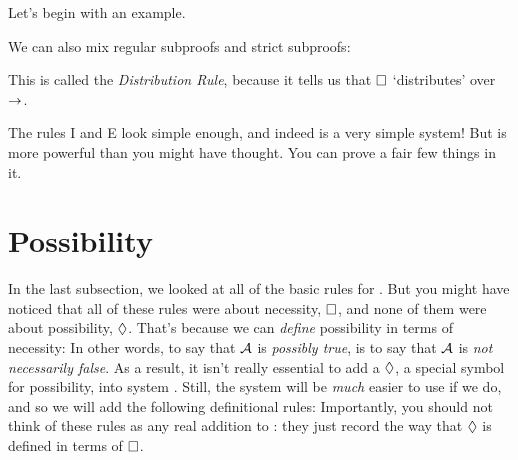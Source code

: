 Let's begin with an example.
\begin{fitchproof}
		\PR
		\PR
		\open
		\AS
		\close
\end{fitchproof}
We can also mix regular subproofs and strict subproofs:
\begin{fitchproof}
		\PR
		\open
		\AS
		\open
		\AS
		\close
		\close
		 
\end{fitchproof}
This is called the \emph{Distribution Rule}, because it tells us that $\Box$ `distributes' over $\rightarrow$.

The rules \ebox I and \ebox E look simple enough, and indeed \mlK{} is a very simple system! But \mlK{} is more powerful than you might have thought. You can prove a fair few things in it.

\section{Possibility}
\label{possibility}

In the last subsection, we looked at all of the basic rules for \mlK. But you might have noticed that all of these rules were about necessity, $\Box$, and none of them were about possibility, $\Diamond$. That's because we can \emph{define} possibility in terms of necessity:
In other words, to say that $\mathcal{A}$ is \emph{possibly true}, is to say that $\mathcal{A}$ is \emph{not necessarily false}. As a result, it isn't really essential to add a $\Diamond$, a special symbol for possibility, into system \mlK. Still, the system will be \emph{much} easier to use if we do, and so we will add the following definitional rules:
Importantly, you should not think of these rules as any real addition to \mlK: they just record the way that $\Diamond$ is defined in terms of $\Box$.

